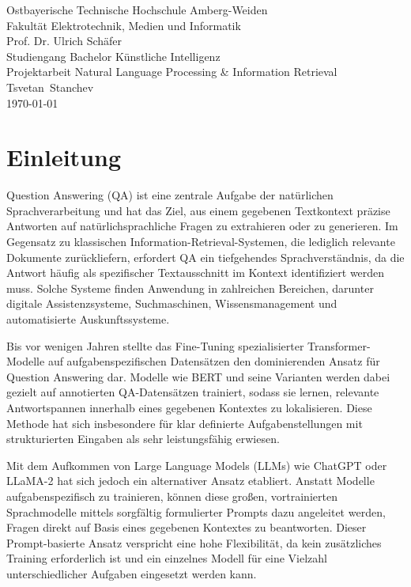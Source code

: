 \documentclass[12pt,oneside]{article}
\newcommand*{\IhrVornameEins}{Tsvetan}
\newcommand*{\IhrNachnameEins}{Stanchev}
\newcommand*{\IhreGruppe}{Gruppe 1}
\newcommand*{\IhrStudiengang}{Bachelor Künstliche Intelligenz}
\newcommand*{\IhreArbeit}{Projektarbeit Natural Language Processing \& Information Retrieval}
\newcommand*{\IhrErstpruefer}{Prof. Dr. Ulrich Schäfer}
\begin{document}
  \thispagestyle{empty}
  \begin{center}
 	\Large
 	Ostbayerische Technische Hochschule Amberg-Weiden\\
 	Fakultät Elektrotechnik, Medien und Informatik\\[.8cm]
 	\large \IhrErstpruefer\\[.8cm]
 	\large Studiengang \IhrStudiengang\\[.8cm] %
 	\Large \IhreArbeit\\[.8cm]
 	\large \IhrVornameEins\ \IhrNachnameEins\\[.8cm]

 	\today\\[2.5cm]
  \end{center}
  
  \tableofcontents

  \clearpage
  
  
  \section{Einleitung}
  

Question Answering (QA) ist eine zentrale Aufgabe der natürlichen
Sprachverarbeitung und hat das Ziel, aus einem gegebenen Textkontext
präzise Antworten auf natürlichsprachliche Fragen zu extrahieren oder zu
generieren. Im Gegensatz zu klassischen Information-Retrieval-Systemen,
die lediglich relevante Dokumente zurückliefern, erfordert QA ein
tiefgehendes Sprachverständnis, da die Antwort häufig als spezifischer
Textausschnitt im Kontext identifiziert werden muss. Solche Systeme
finden Anwendung in zahlreichen Bereichen, darunter digitale
Assistenzsysteme, Suchmaschinen, Wissensmanagement und automatisierte
Auskunftssysteme.

Bis vor wenigen Jahren stellte das Fine-Tuning spezialisierter
Transformer-Modelle auf aufgabenspezifischen Datensätzen den
dominierenden Ansatz für Question Answering dar. Modelle wie BERT und
seine Varianten werden dabei gezielt auf annotierten QA-Datensätzen
trainiert, sodass sie lernen, relevante Antwortspannen innerhalb eines
gegebenen Kontextes zu lokalisieren. Diese Methode hat sich insbesondere
für klar definierte Aufgabenstellungen mit strukturierten Eingaben als
sehr leistungsfähig erwiesen.

Mit dem Aufkommen von Large Language Models (LLMs) wie ChatGPT oder
LLaMA-2 hat sich jedoch ein alternativer Ansatz etabliert. Anstatt
Modelle aufgabenspezifisch zu trainieren, können diese großen,
vortrainierten Sprachmodelle mittels sorgfältig formulierter Prompts
dazu angeleitet werden, Fragen direkt auf Basis eines gegebenen
Kontextes zu beantworten. Dieser Prompt-basierte Ansatz verspricht eine
hohe Flexibilität, da kein zusätzliches Training erforderlich ist und
ein einzelnes Modell für eine Vielzahl unterschiedlicher Aufgaben
eingesetzt werden kann.
\end{document}
